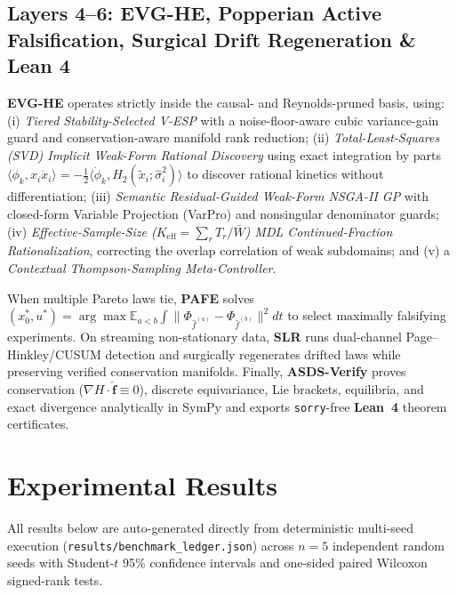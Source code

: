 \documentclass[11pt,a4paper]{article}
\begin{document}
\subsection{Layers 4--6: EVG-HE, Popperian Active Falsification, Surgical Drift Regeneration \& Lean 4}
\textbf{EVG-HE} operates strictly inside the causal- and Reynolds-pruned basis, using:
(i) \emph{Tiered Stability-Selected V-ESP} with a noise-floor-aware cubic variance-gain guard and conservation-aware manifold rank reduction;
(ii) \emph{Total-Least-Squares (SVD) Implicit Weak-Form Rational Discovery} using exact integration by parts $\langle \phi_k, x_i \dot{x}_i \rangle = -\frac{1}{2}\langle \dot{\phi}_k, H_2(\tilde{x}_i; \hat{\sigma}_i^2) \rangle$ to discover rational kinetics without differentiation;
(iii) \emph{Semantic Residual-Guided Weak-Form NSGA-II GP} with closed-form Variable Projection (VarPro) and nonsingular denominator guards;
(iv) \emph{Effective-Sample-Size ($K_{\text{eff}} = \sum_r T_r / \bar{W}$) MDL Continued-Fraction Rationalization}, correcting the overlap correlation of weak subdomains; and
(v) a \emph{Contextual Thompson-Sampling Meta-Controller}.

When multiple Pareto laws tie, \textbf{PAFE} solves $(x_0^*, u^*) = \arg\max \mathbb{E}_{a<b}\int \|\Phi_{\hat{f}^{(a)}} - \Phi_{\hat{f}^{(b)}}\|^2 dt$ to select maximally falsifying experiments. On streaming non-stationary data, \textbf{SLR} runs dual-channel Page--Hinkley/CUSUM detection and surgically regenerates drifted laws while preserving verified conservation manifolds. Finally, \textbf{ASDS-Verify} proves conservation ($\nabla H \cdot \hat{\mathbf{f}} \equiv 0$), discrete equivariance, Lie brackets, equilibria, and exact divergence analytically in SymPy and exports \texttt{sorry}-free \textbf{Lean~4} theorem certificates.

\section{Experimental Results}
All results below are auto-generated directly from deterministic multi-seed execution (\texttt{results/benchmark\_ledger.json}) across $n=5$ independent random seeds with Student-$t$ 95\% confidence intervals and one-sided paired Wilcoxon signed-rank tests.
\end{document}

